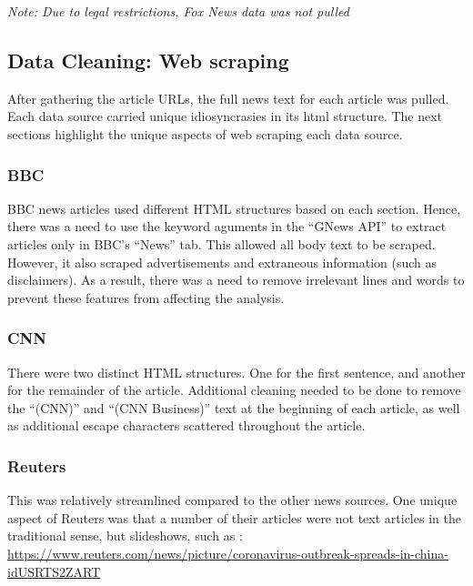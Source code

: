 \documentclass[
]{article}
\begin{document}
\emph{Note: Due to legal restrictions, Fox News data was not pulled}

\hypertarget{data-cleaning-web-scraping}{%
\subsection{Data Cleaning: Web
scraping}\label{data-cleaning-web-scraping}}

After gathering the article URLs, the full news text for each article
was pulled. Each data source carried unique idiosyncrasies in its html
structure. The next sections highlight the unique aspects of web
scraping each data source.

\hypertarget{bbc}{%
\subsubsection{BBC}\label{bbc}}

BBC news articles used different HTML structures based on each section.
Hence, there was a need to use the keyword aguments in the ``GNews API''
to extract articles only in BBC's ``News'' tab. This allowed all body
text to be scraped. However, it also scraped advertisements and
extraneous information (such as disclaimers). As a result, there was a
need to remove irrelevant lines and words to prevent these features from
affecting the analysis.

\hypertarget{cnn}{%
\subsubsection{CNN}\label{cnn}}

There were two distinct HTML structures. One for the first sentence, and
another for the remainder of the article. Additional cleaning needed to
be done to remove the ``(CNN)'' and ``(CNN Business)'' text at the
beginning of each article, as well as additional escape characters
scattered throughout the article.

\hypertarget{reuters}{%
\subsubsection{Reuters}\label{reuters}}

This was relatively streamlined compared to the other news sources. One
unique aspect of Reuters was that a number of their articles were not
text articles in the traditional sense, but slideshows, such as :
\url{https://www.reuters.com/news/picture/coronavirus-outbreak-spreads-in-china-idUSRTS2ZART}
\end{document}
